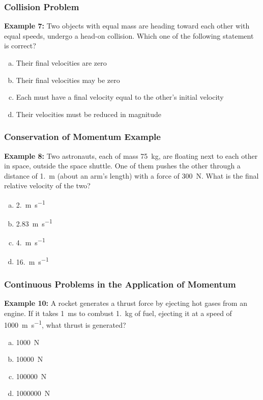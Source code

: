 \documentclass[12pt,compress,aspectratio=169]{beamer}
\begin{document}
\begin{frame}
  \frametitle{Collision Problem}
  \textbf{Example 7:} Two objects with equal mass are heading toward each
  other with equal speeds, undergo a head-on collision. Which one of the
  following statement is correct?
  \begin{enumerate}[(a)]
  \item Their final velocities are zero
  \item Their final velocities may be zero
  \item Each must have a final velocity equal to the other's initial velocity
  \item Their velocities must be reduced in magnitude
  \end{enumerate}
\end{frame}

\begin{frame}
  \frametitle{Conservation of Momentum Example}
  \textbf{Example 8:} Two astronauts, each of mass \SI{75}{\kilo\gram}, are
  floating next to each other in space, outside the space shuttle. One of them
  pushes the other through a distance of \SI{1.}{\metre} (about an arm's
  length) with a force of \SI{300}{\newton}. What is the final relative
  velocity of the two?
  \begin{enumerate}[(a)]
  \item \SI{2.}{\metre\per\second}
  \item \SI{2.83}{\metre\per\second}
  \item \SI{4.}{\metre\per\second}
  \item \SI{16.}{\metre\per\second}
  \end{enumerate}
\end{frame}

\begin{frame}
  \frametitle{Continuous Problems in the Application of Momentum}

%
  \textbf{Example 10:} A rocket generates a thrust force by ejecting hot gases
  from an engine. If it takes \SI{1}{\milli\second} to combust
  \SI{1.}{\kilo\gram} of fuel, ejecting it at a speed of
  \SI{1000}{\metre\per\second}, what thrust is generated?
  \begin{enumerate}[(a)]
  \item \SI{1000}{\newton}
  \item \SI{10000}{\newton}
  \item \SI{100000}{\newton}
  \item \SI{1000000}{\newton}
  \end{enumerate}
\end{frame}
\end{document}
